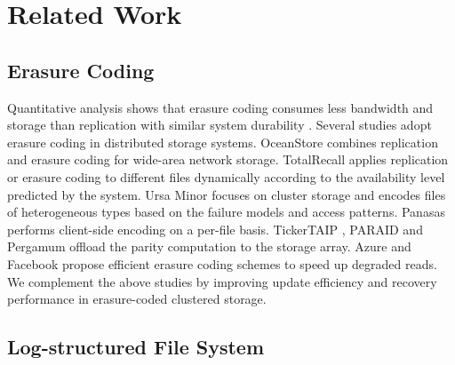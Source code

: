 \chapter{Related Work}
\label{chap:relatedwork}

\section{Erasure Coding}

Quantitative analysis shows that erasure coding consumes less bandwidth and
storage than replication with similar system durability
\cite{weatherspoon02,rodrigues05}.  Several studies adopt erasure coding in
distributed storage systems.  OceanStore \cite{kubiatowicz00,rhea03} combines
replication and erasure coding for wide-area network storage.  TotalRecall
\cite{bhagwan04} applies replication or erasure coding to different files
dynamically according to the availability level predicted by the system.  Ursa
Minor \cite{abd05} focuses on cluster storage and encodes files of
heterogeneous types based on the failure models and access patterns.  Panasas
\cite{welch08} performs client-side encoding on a per-file basis. 
TickerTAIP \cite{cao94}, PARAID \cite{weddle07} and Pergamum \cite{storer08}
offload the parity computation to the storage array.
Azure \cite{huang12} and Facebook \cite{sathiamoorthy13} propose efficient
erasure coding schemes to speed up degraded reads. 
We complement the above studies by improving update efficiency and recovery
performance in erasure-coded clustered storage. 

\section{Log-structured File System}

